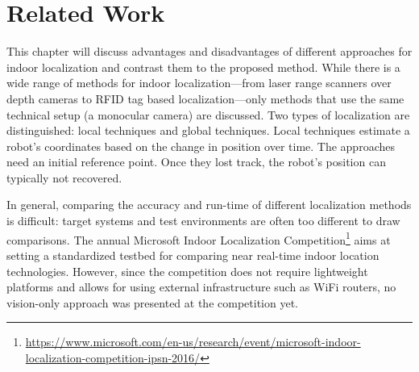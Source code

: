 \chapter{Related Work}
\label{chap:relatedwork}

This chapter will discuss advantages and disadvantages of different approaches for indoor localization and
contrast them to the proposed method. While there is a wide range of methods for indoor localization---from laser range scanners over depth cameras to RFID tag based localization---only methods that use the same technical setup (a monocular camera) are discussed. Two types of localization are distinguished: local techniques and global techniques. Local techniques estimate a robot's coordinates based on the change in position over time. The approaches need an initial reference point. Once they lost track, the robot's position can typically not recovered. 


In general, comparing the accuracy and run-time of different localization methods is difficult: target systems and test environments are often too different to draw comparisons. The annual Microsoft Indoor Localization Competition\footnote{\url{https://www.microsoft.com/en-us/research/event/microsoft-indoor-localization-competition-ipsn-2016/}} aims at setting a standardized testbed for comparing near real-time indoor location technologies. However, since the competition does not require lightweight platforms and allows for using external infrastructure such as WiFi routers, no vision-only approach was presented at the competition yet.